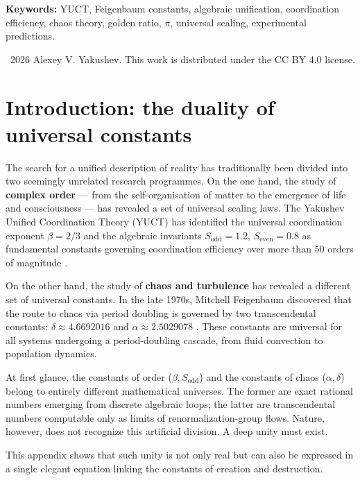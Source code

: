 \documentclass[11pt,a4paper]{article}
\begin{document}
	\vspace{1cm}
	\noindent
	\small\textbf{Keywords:} YUCT, Feigenbaum constants, algebraic unification, coordination efficiency, chaos theory, golden ratio, \(\pi\), universal scaling, experimental predictions.
	
	\vspace{0.5cm}
	\noindent
	\textcopyright\ 2026 Alexey V. Yakushev. This work is distributed under the CC BY 4.0 license.
	
	\clearpage
	\tableofcontents
	\newpage
	
	\section{Introduction: the duality of universal constants}
	
	The search for a unified description of reality has traditionally been divided into two seemingly unrelated research programmes. On the one hand, the study of \textbf{complex order} — from the self-organisation of matter to the emergence of life and consciousness — has revealed a set of universal scaling laws. The Yakushev Unified Coordination Theory (YUCT) has identified the universal coordination exponent \(\beta = 2/3\) and the algebraic invariants \(S_{\mathrm{odd}} = 1.2\), \(S_{\mathrm{even}} = 0.8\) as fundamental constants governing coordination efficiency over more than 50 orders of magnitude \cite{Yakushev2026, AppendixAF}.
	
	On the other hand, the study of \textbf{chaos and turbulence} has revealed a different set of universal constants. In the late 1970s, Mitchell Feigenbaum discovered that the route to chaos via period doubling is governed by two transcendental constants: \(\delta \approx 4.6692016\) and \(\alpha \approx 2.5029078\) \cite{Feigenbaum1978}. These constants are universal for all systems undergoing a period-doubling cascade, from fluid convection to population dynamics.
	
	At first glance, the constants of order (\(\beta, S_{\mathrm{odd}}\)) and the constants of chaos (\(\alpha, \delta\)) belong to entirely different mathematical universes. The former are exact rational numbers emerging from discrete algebraic loops; the latter are transcendental numbers computable only as limits of renormalization-group flows. Nature, however, does not recognize this artificial division. A deep unity must exist.
	
	This appendix shows that such unity is not only real but can also be expressed in a single elegant equation linking the constants of creation and destruction.
	
\end{document}
